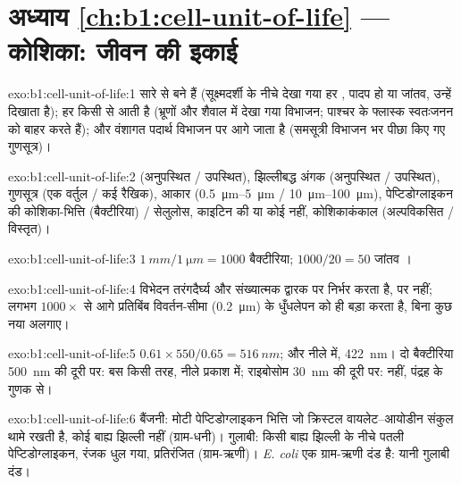 \section*{अध्याय \ref{ch:b1:cell-unit-of-life} --- कोशिका: जीवन की इकाई}

\begin{solution}{exo:b1:cell-unit-of-life:1}
सारे   से बने हैं (सूक्ष्मदर्शी के नीचे देखा गया हर ,
पादप हो या जांतव, उन्हें दिखाता है); हर  किसी  से आती है
(भ्रूणों और शैवाल में देखा गया विभाजन; पाश्चर के फ्लास्क स्वतःजनन को
बाहर करते हैं); और वंशागत पदार्थ विभाजन पर आगे जाता है
(समसूत्री विभाजन भर पीछा किए गए गुणसूत्र)।
\end{solution}

\begin{solution}{exo:b1:cell-unit-of-life:2}
 (अनुपस्थित / उपस्थित), झिल्लीबद्ध अंगक (अनुपस्थित /
उपस्थित), गुणसूत्र (एक वर्तुल / कई रैखिक), आकार
(\qtyrange{0.5}{5}{\micro m} / \qtyrange{10}{100}{\micro m}), पेप्टिडोग्लाइकन
की कोशिका-भित्ति (बैक्टीरिया) / सेलुलोस, काइटिन की या कोई नहीं,
कोशिकाकंकाल (अल्पविकसित / विस्तृत)।
\end{solution}

\begin{solution}{exo:b1:cell-unit-of-life:3}
$\qty{1}{mm}/\qty{1}{\micro m} = 1000$ बैक्टीरिया; $1000/20 = 50$ जांतव
।
\end{solution}

\begin{solution}{exo:b1:cell-unit-of-life:4}
विभेदन तरंगदैर्घ्य और संख्यात्मक द्वारक पर निर्भर करता है,  पर
नहीं; लगभग $1000\times$ से आगे प्रतिबिंब विवर्तन-सीमा
(\qty{0.2}{\micro m}) के धुँधलेपन को ही बड़ा करता है, बिना कुछ नया
अलगाए।
\end{solution}

\begin{solution}{exo:b1:cell-unit-of-life:5}
$0.61\times 550/0.65 = \qty{516}{nm}$; और नीले में, \qty{422}{nm}। दो
बैक्टीरिया \qty{500}{nm} की दूरी पर: बस किसी तरह, नीले प्रकाश में;
राइबोसोम \qty{30}{nm} की दूरी पर: नहीं, पंद्रह के गुणक से।
\end{solution}

\begin{solution}{exo:b1:cell-unit-of-life:6}
बैंजनी: मोटी पेप्टिडोग्लाइकन भित्ति जो क्रिस्टल वायलेट--आयोडीन
संकुल थामे रखती है, कोई बाह्य झिल्ली नहीं (ग्राम-धनी)। गुलाबी: किसी
बाह्य झिल्ली के नीचे पतली पेप्टिडोग्लाइकन, रंजक धुल गया, प्रतिरंजित (ग्राम-ऋणी)।
\emph{E. coli} एक ग्राम-ऋणी दंड है: यानी गुलाबी दंड।
\end{solution}

